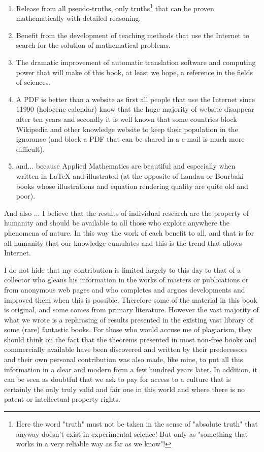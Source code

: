 \begin{enumerate}
		\item Release from all pseudo-truths, only truths\footnote{Here the word "truth" must not be taken in the sense of "absolute truth" that anyway doesn't exist in experimental science! But only as "something that works in a very reliable way as far as we know"!} that can be proven mathematically with detailed reasoning.

		\item Benefit from the development of teaching methods that use the Internet to search for the solution of mathematical problems.

		\item The dramatic improvement of automatic translation software and computing power that will make of this book, at least we hope, a reference in the fields of sciences.
		
		\item A PDF is better than a website as first all people that use the Internet since 11990 (holocene calendar) know that the huge majority of website disappear after ten years and secondly it is well known that some countries block Wikipedia and other knowledge website to keep their population in the ignorance (and block a PDF that can be shared in a e-mail is much more difficult).
		
		\item and... because Applied Mathematics are beautiful and especially when written in \LaTeX{} and illustrated (at the opposite of Landau or Bourbaki books whose illustrations and equation rendering quality are quite old and poor).
\end{enumerate}

	And also ... I believe that the results of individual research are the property of humanity and should be available to all those who explore anywhere the phenomena of nature. In this way the work of each benefit to all, and that is for all humanity that our knowledge cumulates and this is the trend that allows Internet.

	I do not hide that my contribution is limited largely to this day to that of a collector who gleans his information in the works of masters or publications or from anonymous web pages and who completes and argues developments and improved them when this is possible. Therefore some of the material in this book is original, and some comes from primary literature. However the vast majority of what we wrote is a rephrasing of results presented in the existing vast library of some (rare) fantastic books. For those who would accuse me of plagiarism, they should think on the fact that the theorems presented in most non-free books and commercially available have been discovered and written by their predecessors and their own personal contribution was also made, like mine, to put all this information in a clear and modern form a few hundred years later. In addition, it can be seen as doubtful that we ask to pay for access to a culture that is certainly the only truly valid and fair one in this world and where there is no patent or intellectual property rights.
	
